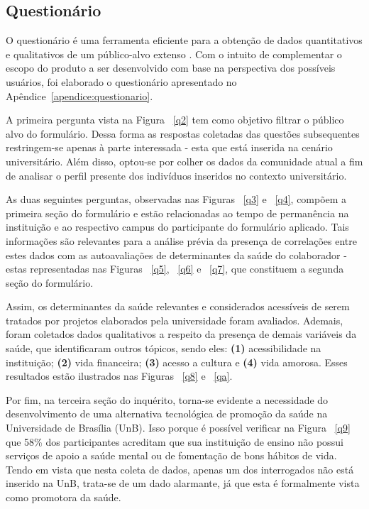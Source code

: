 
\subsection{Questionário}

O questionário é uma ferramenta eficiente para a obtenção de dados quantitativos e qualitativos de um público-alvo extenso \cite{vazquez2016engenharia}. Com o intuito de complementar o escopo do produto a ser desenvolvido com base na perspectiva dos possíveis usuários, foi elaborado o questionário apresentado no Apêndice~\ref{apendice:questionario}.

A primeira pergunta vista na Figura ~\ref{q2} tem como objetivo filtrar o público alvo do formulário. Dessa forma as respostas coletadas das questões subsequentes restringem-se apenas à parte interessada - esta que está inserida na cenário universitário. Além disso, optou-se por colher os dados da comunidade atual a fim de analisar o perfil presente dos indivíduos inseridos no contexto universitário.

As duas seguintes perguntas, observadas nas Figuras ~\ref{q3} e ~\ref{q4}, compõem a primeira seção do formulário e estão relacionadas ao tempo de permanência na instituição e ao respectivo campus do participante do formulário aplicado. Tais informações são relevantes para a análise prévia da presença de correlações entre estes dados com as autoavaliações de determinantes da saúde do colaborador - estas representadas nas Figuras ~\ref{q5}, ~\ref{q6} e ~\ref{q7}, que constituem a segunda seção do formulário.

Assim, os determinantes da saúde relevantes e considerados acessíveis de serem tratados por projetos elaborados pela universidade foram avaliados. Ademais, foram coletados dados qualitativos a respeito da presença de demais variáveis da saúde, que identificaram outros tópicos, sendo eles: \textbf{(1) }acessibilidade na instituição; \textbf{(2)} vida financeira; \textbf{(3)} acesso a cultura e \textbf{(4)} vida amorosa. Esses resultados estão ilustrados nas Figuras ~\ref{q8} e ~\ref{qa}.

Por fim, na terceira seção do inquérito, torna-se evidente a necessidade do desenvolvimento de uma alternativa tecnológica de promoção da saúde na Universidade de Brasília (UnB). Isso porque é possível verificar na Figura ~\ref{q9} que 58\% dos participantes acreditam que sua instituição de ensino não possui serviços de apoio a saúde mental ou de fomentação de bons hábitos de vida. Tendo em vista que nesta coleta de dados, apenas um dos interrogados não está inserido na UnB, trata-se de um dado alarmante, já que esta é formalmente vista como promotora da saúde.

